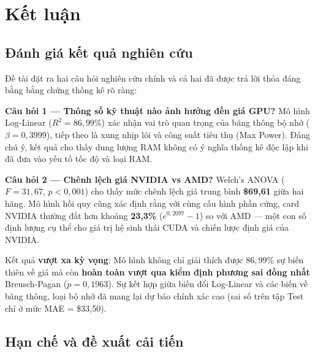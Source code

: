 \section{Kết luận}
\label{sec:ket_luan}

\subsection{Đánh giá kết quả nghiên cứu}

Đề tài đặt ra hai câu hỏi nghiên cứu chính và cả hai đã được trả lời thỏa đáng bằng bằng chứng thống kê rõ ràng:

\textbf{Câu hỏi 1 --- Thông số kỹ thuật nào ảnh hưởng đến giá GPU?} Mô hình Log-Linear ($R^2 = 86{,}99\%$) xác nhận vai trò quan trọng của băng thông bộ nhớ ($\beta = 0{,}3999$), tiếp theo là xung nhịp lõi và công suất tiêu thụ (Max Power). Đáng chú ý, kết quả cho thấy dung lượng RAM không có ý nghĩa thống kê độc lập khi đã đưa vào yếu tố tốc độ và loại RAM.

\textbf{Câu hỏi 2 --- Chênh lệch giá NVIDIA vs AMD?} Welch's ANOVA ($F = 31{,}67$, $p < 0{,}001$) cho thấy mức chênh lệch giá trung bình \textbf{\$69,61} giữa hai hãng. Mô hình hồi quy cũng xác định rằng với cùng cấu hình phần cứng, card NVIDIA thường đắt hơn khoảng \textbf{23{,}3\%} ($e^{0{,}2097} - 1$) so với AMD --- một con số định lượng cụ thể cho giá trị hệ sinh thái CUDA và chiến lược định giá của NVIDIA.

Kết quả \textbf{vượt xa kỳ vọng}: Mô hình không chỉ giải thích được $86{,}99\%$ sự biến thiên về giá mà còn \textbf{hoàn toàn vượt qua kiểm định phương sai đồng nhất} Breusch-Pagan ($p = 0{,}1963$). Sự kết hợp giữa biến đổi Log-Linear và các biến về băng thông, loại bộ nhớ đã mang lại dự báo chính xác cao (sai số trên tập Test chỉ ở mức MAE = \$33,50).

\subsection{Hạn chế và đề xuất cải tiến}

